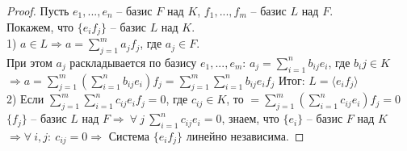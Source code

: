\begin{proof}
    Пусть $e_1,...,e_n$ -- базис $F$ над $K$, $f_1,...,f_m$ -- базис $L$ над $F$.\\
    Покажем, что $\{e_if_j \}$ -- базис $L$ над $K$.\\
    1) $a\in L\Rightarrow a=\sum_{j=1}^ma_jf_j$, где $a_j\in F$.\\
    При этом $a_j$ раскладывается по базису $e_1,...,e_m$: $a_j=\sum_{i=1}^nb_{ij}e_i$, где $b_ij\in K$\\
    $\Rightarrow a=\sum_{j=1}^m\left(\sum_{i=1}^nb_{ij}e_i\right)f_j=\sum_{j=1}^m\sum_{i=1}^nb_{ij}e_if_j$ Итог: $L=\langle e_if_j \rangle$\\
    2) Если $\sum_{j=1}^{m}\sum_{i=1}^nc_{ij}e_if_j=0$, где $c_{ij}\in K$, то $=\sum_{j=1}^m\left(\sum_{i=1}^nc_{ij}e_i\right)f_j=0$\\
    $\{f_j\}$ -- базис $L$ над $F \Rightarrow \ \forall \ j\ \sum_{i=1}^nc_{ij}e_i=0$, знаем, что $\{e_i\}$ -- базис $F$ над $K$\\
    $\Rightarrow \forall \ i,j:\ c_{ij}=0\Rightarrow$ Система $\{e_if_j\}$ линейно независима.
\end{proof}